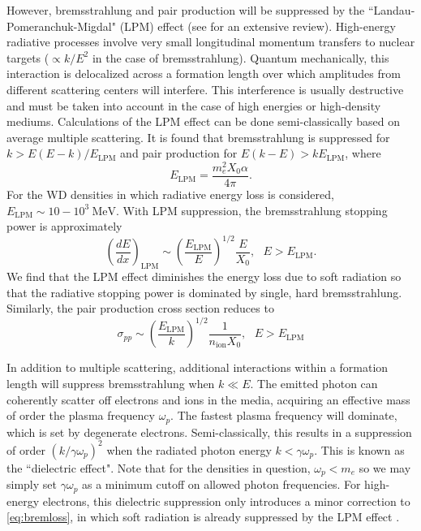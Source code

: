 \documentclass[twocolumn,showpacs,preprintnumbers,amsmath,amssymb,prd]{revtex4}
\def\r{\right)}
\def\l{\left(}
\begin{document}
\begin{appendices}
However, bremsstrahlung and pair production will be suppressed by the ``Landau-Pomeranchuk-Migdal" (LPM) effect (see \cite{Klein:1998du} for an extensive review). High-energy radiative processes involve very small longitudinal momentum transfers to nuclear targets ($\propto k/E^2$ in the case of bremsstrahlung). Quantum mechanically, this interaction is delocalized across a formation length over which amplitudes from different scattering centers will interfere. This interference is usually destructive and must be taken into account in the case of high energies or high-density mediums. Calculations of the LPM effect can be done semi-classically based on average multiple scattering. It is found that bremsstrahlung is suppressed for $k > E(E-k)/E_\text{LPM}$ and pair production for $E(k-E) > k E_\text{LPM}$, where
\begin{equation}
\label{eq:LPM}
E_\text{LPM} = \frac{m_e^2 X_0 \alpha}{4 \pi}.
\end{equation}
For the WD densities in which radiative energy loss is considered, $E_\text{LPM} \sim 10-10^{3} ~\text{MeV}$. With LPM suppression, the bremsstrahlung stopping power is approximately
\begin{equation}
\label{eq:bremloss}
\l\frac{dE}{dx}\r_\text{LPM} \sim \l\frac{E_\text{LPM}}{E} \r^{1/2} \frac{E}{X_0}, ~~~ E>E_\text{LPM}.
\end{equation}
We find that the LPM effect diminishes the energy loss due to soft radiation so that the radiative stopping power is dominated by single, hard bremsstrahlung. Similarly, the pair production cross section reduces to
\begin{equation}
\sigma_{pp} \sim \l\frac{E_\text{LPM}}{k} \r^{1/2} \frac{1}{n_\text{ion} X_0}, ~~~ E>E_\text{LPM}
\end{equation}

In addition to multiple scattering, additional interactions within a formation length will suppress bremsstrahlung when $k \ll E$. The emitted photon can coherently scatter off electrons and ions in the media, acquiring an effective mass of order the plasma frequency $\omega_p$. The fastest plasma frequency will dominate, which is set by degenerate electrons.
Semi-classically, this results in a suppression of order $(k/\gamma \omega_p)^2$ when the radiated photon energy $k < \gamma \omega_p $. This is known as the ``dielectric effect". Note that for the densities in question, $\omega_p < m_e$ so we may simply set $\gamma \omega_p$ as a minimum cutoff on allowed photon frequencies. For high-energy electrons, this dielectric suppression only introduces a minor correction to \eqref{eq:bremloss}, in which soft radiation is already suppressed by the LPM effect \cite{Klein:1998du}.


\end{appendices}
\end{document}
